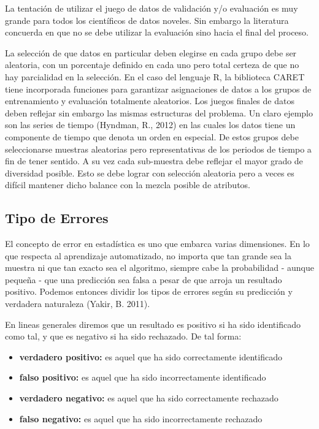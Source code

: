 \documentclass[letterpaper, spanish, 11pt]{report}
\begin{document}
La tentación de utilizar el juego de datos de validación y/o evaluación es muy grande para todos los científicos de datos noveles. Sin embargo la literatura concuerda en que no se debe utilizar la evaluación sino hacia el final del proceso.

La selección de que datos en particular deben elegirse en cada grupo debe ser aleatoria, con un porcentaje definido en cada uno pero total certeza de que no hay parcialidad en la selección. En el caso del lenguaje R, la biblioteca CARET tiene incorporada funciones para garantizar asignaciones de datos a los grupos de entrenamiento y evaluación totalmente aleatorios. Los juegos finales de datos deben reflejar sin embargo las mismas estructuras del problema. Un claro ejemplo son las series de tiempo (Hyndman, R., 2012) en las cuales los datos tiene un componente de tiempo que denota un orden en especial. De estos grupos debe seleccionarse muestras aleatorias pero representativas de los periodos de tiempo a fin de tener sentido. A su vez cada sub-muestra debe reflejar el mayor grado de diversidad posible. Esto se debe lograr con selección aleatoria pero a veces es difícil mantener dicho balance con la mezcla posible de atributos.

\subsection{Tipo de Errores}
El concepto de error en estadística es uno que embarca varias dimensiones. En lo que respecta al aprendizaje automatizado, no importa que tan grande sea la muestra ni que tan exacto sea el algoritmo, siempre cabe la probabilidad - aunque pequeña - que una predicción sea falsa a pesar de que arroja un resultado positivo. Podemos entonces dividir los tipos de errores según su predicción y verdadera naturaleza (Yakir, B. 2011).

En lineas generales diremos que un resultado es positivo si ha sido identificado como tal, y que es negativo si ha sido rechazado. De tal forma:
\begin{itemize}
	\item \textbf{verdadero positivo:} es aquel que ha sido correctamente identificado
	\item \textbf{falso positivo:} es aquel que ha sido incorrectamente identificado
	\item \textbf{verdadero negativo:} es aquel que ha sido correctamente rechazado
	\item \textbf{falso negativo:} es aquel que ha sido incorrectamente rechazado
\end{itemize}
\end{document}
